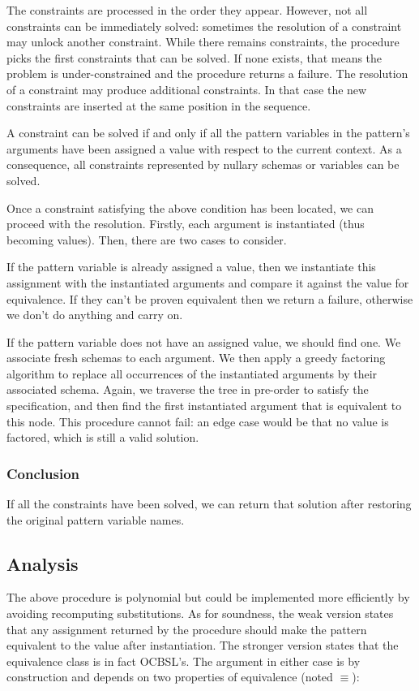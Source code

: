 The constraints are processed in the order they appear. However, not all constraints can be immediately solved: sometimes the resolution of a constraint may unlock another constraint. While there remains constraints, the procedure picks the first constraints that can be solved. If none exists, that means the problem is under-constrained and the procedure returns a failure. The resolution of a constraint may produce additional constraints. In that case the new constraints are inserted at the same position in the sequence.

A constraint can be solved if and only if all the pattern variables in the pattern's arguments have been assigned a value with respect to the current context. As a consequence, all constraints represented by nullary schemas or variables can be solved.

Once a constraint satisfying the above condition has been located, we can proceed with the resolution. Firstly, each argument is instantiated (thus becoming values). Then, there are two cases to consider.

If the pattern variable is already assigned a value, then we instantiate this assignment with the instantiated arguments and compare it against the value for equivalence. If they can't be proven equivalent then we return a failure, otherwise we don't do anything and carry on.

If the pattern variable does not have an assigned value, we should find one. We associate fresh schemas to each argument. We then apply a greedy factoring algorithm to replace all occurrences of the instantiated arguments by their associated schema. Again, we traverse the tree in pre-order to satisfy the specification, and then find the first instantiated argument that is equivalent to this node. This procedure cannot fail: an edge case would be that no value is factored, which is still a valid solution.

\subsubsection{Conclusion}

If all the constraints have been solved, we can return that solution after restoring the original pattern variable names.

\subsection{Analysis}

The above procedure is polynomial but could be implemented more efficiently by avoiding recomputing substitutions. As for soundness, the weak version states that any assignment returned by the procedure should make the pattern equivalent to the value after instantiation. The stronger version states that the equivalence class is in fact OCBSL's. The argument in either case is by construction and depends on two properties of equivalence (noted $\equiv$):

